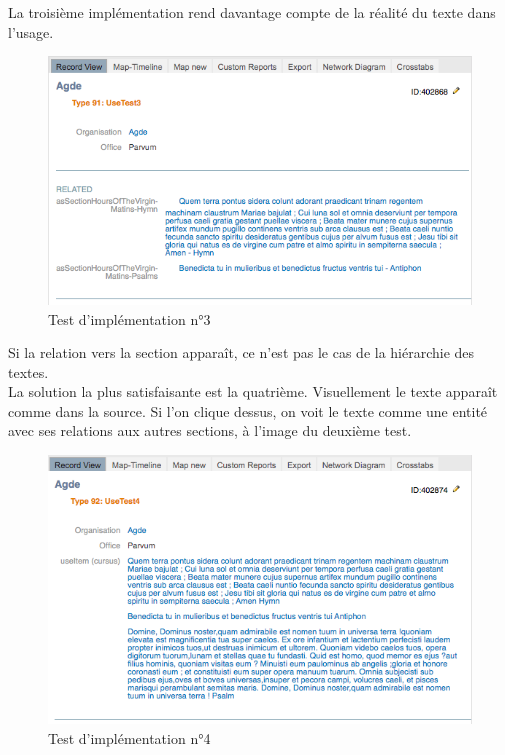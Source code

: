 \documentclass[a4paper,12pt,twoside]{book}
\begin{document}
La troisième implémentation rend davantage compte de la réalité du texte dans l’usage. 

    \begin{figure}[!h]
    \centering
    \includegraphics[width=15cm]{img/Modelisation/Tests_Implementation/UseTest3.png}
    \caption{Test d'implémentation n°3}
    \end{figure}

Si la relation vers la section apparaît, ce n'est pas le cas de la hiérarchie des textes.\\

La solution la plus satisfaisante est la quatrième. Visuellement le texte apparaît comme dans la source. Si l’on clique dessus, on voit le texte comme une entité avec ses relations aux autres sections, à l'image du deuxième test.

    \begin{figure}[!h]
    \centering
    \includegraphics[width=15cm]{img/Modelisation/Tests_Implementation/UseTest4.png}
    \caption{Test d'implémentation n°4}
    \end{figure}
\end{document}
